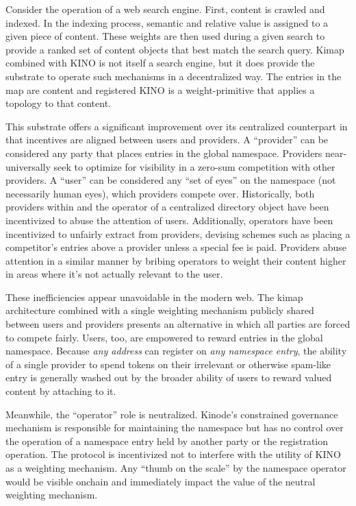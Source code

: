 \documentclass[runningheads]{llncs}
\begin{document}
Consider the operation of a web search engine.
First, content is crawled and indexed.
In the indexing process, semantic and relative value is assigned to a given piece of content.
These weights are then used during a given search to provide a ranked set of content objects that best match the search query.
Kimap combined with KINO is not itself a search engine, but it does provide the substrate to operate such mechanisms in a decentralized way.
The entries in the map are content and registered KINO is a weight-primitive that applies a topology to that content.

This substrate offers a significant improvement over its centralized counterpart in that incentives are aligned between users and providers.
A ``provider'' can be considered any party that places entries in the global namespace.
Providers near-universally seek to optimize for visibility in a zero-sum competition with other providers.
A ``user'' can be considered any ``set of eyes'' on the namespace (not necessarily human eyes), which providers compete over.
Historically, both providers within and the operator of a centralized directory object have been incentivized to abuse the attention of users.
Additionally, operators have been incentivized to unfairly extract from providers, devising schemes such as placing a competitor's entries above a provider unless a special fee is paid.
Providers abuse attention in a similar manner by bribing operators to weight their content higher in areas where it's not actually relevant to the user.

These inefficiencies appear unavoidable in the modern web.
The kimap architecture combined with a single weighting mechanism publicly shared between users and providers presents an alternative in which all parties are forced to compete fairly.
Users, too, are empowered to reward entries in the global namespace.
Because \textit{any address} can register on \textit{any namespace entry}, the ability of a single provider to spend tokens on their irrelevant or otherwise spam-like entry is generally washed out by the broader ability of users to reward valued content by attaching to it.

Meanwhile, the ``operator'' role is neutralized.
Kinode's constrained governance mechanism is responsible for maintaining the namespace but has no control over the operation of a namespace entry held by another party or the registration operation.
The protocol is incentivized not to interfere with the utility of KINO as a weighting mechanism.
Any ``thumb on the scale'' by the namespace operator would be visible onchain and immediately impact the value of the neutral weighting mechanism.
\end{document}
